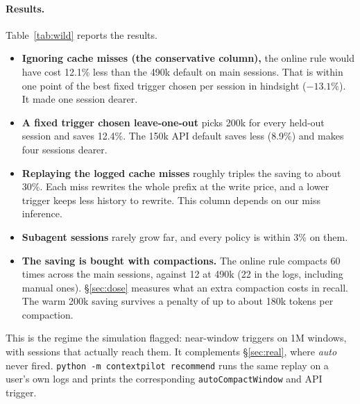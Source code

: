 \documentclass[11pt]{article}
\begin{document}
\paragraph{Results.} Table~\ref{tab:wild} reports the results.
\begin{itemize}
\item \textbf{Ignoring cache misses (the conservative column),} the online rule would have cost 12.1\% less than the 490k default on main sessions. That is within one point of the best fixed trigger chosen per session in hindsight ($-13.1\%$). It made one session dearer.
\item \textbf{A fixed trigger chosen leave-one-out} picks 200k for every held-out session and saves 12.4\%. The 150k API default saves less (8.9\%) and makes four sessions dearer.
\item \textbf{Replaying the logged cache misses} roughly triples the saving to about 30\%. Each miss rewrites the whole prefix at the write price, and a lower trigger keeps less history to rewrite. This column depends on our miss inference.
\item \textbf{Subagent sessions} rarely grow far, and every policy is within 3\% on them.
\item \textbf{The saving is bought with compactions.} The online rule compacts 60 times across the main sessions, against 12 at 490k (22 in the logs, including manual ones). \S\ref{sec:dose} measures what an extra compaction costs in recall. The warm 200k saving survives a penalty of up to about 180k tokens per compaction.
\end{itemize}
\begin{sloppypar}This is the regime the simulation flagged: near-window triggers on 1M windows, with sessions that actually reach them. It complements \S\ref{sec:real}, where \emph{auto} never fired. \texttt{python -m contextpilot recommend} runs the same replay on a user's own logs and prints the corresponding \texttt{autoCompactWindow} and API trigger.\end{sloppypar}

\begin{table}[t]
\centering
\small
\caption{In-the-wild replay: total cost change vs.\ Claude Code's 490k auto-compaction (\%; lower is better). ``Warm'' ignores cache misses; ``misses'' replays them at the logged calls. Helped/hurt counts main sessions more than 1\% cheaper or dearer, warm.}
\label{tab:wild}

\end{table}
\end{document}
